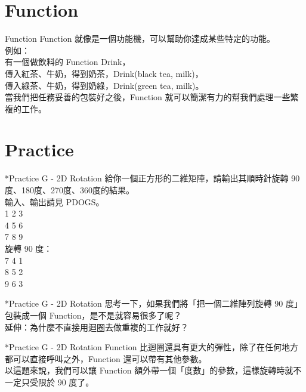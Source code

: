 \documentclass[t]{beamer}
\begin{document}
\section{Function}
\begin{frame}{Function}
  Function 就像是一個功能機，可以幫助你達成某些特定的功能。\\
  \vspace{1em}
  例如：\\
  有一個做飲料的 Function Drink，\\
  傳入紅茶、牛奶，得到奶茶，Drink(black tea, milk)，\\
  傳入綠茶、牛奶，得到奶綠，Drink(green tea, milk)。\\
  \vspace{1em}
  當我們把任務妥善的包裝好之後，Function 就可以簡潔有力的幫我們處理一些繁複的工作。
\end{frame}

\section{Practice}
\begin{frame}{*Practice G - 2D Rotation}
  給你一個正方形的二維矩陣，請輸出其順時針旋轉 90 度、180度、270度、360度的結果。\\
  輸入、輸出請見 PDOGS。\\
  \vspace{1em}
  1 2 3\\
  4 5 6\\
  7 8 9\\
  \vspace{1em}
  旋轉 90 度：\\
  \vspace{1em}
  7 4 1\\
  8 5 2\\
  9 6 3
\end{frame}

\begin{frame}{*Practice G - 2D Rotation}
  思考一下，如果我們將「把一個二維陣列旋轉 90 度」包裝成一個 Function，是不是就容易很多了呢？\\
  \vspace{2em}
  延伸：為什麼不直接用迴圈去做重複的工作就好？
\end{frame}

\begin{frame}{*Practice G - 2D Rotation}
  Function 比迴圈還具有更大的彈性，除了在任何地方都可以直接呼叫之外，Function 還可以帶有其他參數。\\
  \vspace{1em}
  以這題來說，我們可以讓 Function 額外帶一個「度數」的參數，這樣旋轉時就不一定只受限於 90 度了。
\end{frame}
\end{document}
